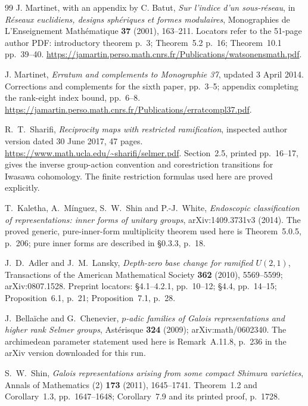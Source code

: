 \documentclass[11pt,a4paper]{article}
\theoremstyle{definition}
\begin{document}
\begin{thebibliography}{99}
J. Martinet, with an appendix by C. Batut,
\emph{Sur l'indice d'un sous-r\'eseau},
in \emph{R\'eseaux euclidiens, designs sph\'eriques et formes modulaires},
Monographies de L'Enseignement Math\'ematique \textbf{37}
(2001), 163--211.
Locators refer to the 51-page author PDF:
introductory theorem p.~3; Theorem~5.2 p.~16;
Theorem~10.1 pp.~39--40.
\url{https://jamartin.perso.math.cnrs.fr/Publications/watsonensmath.pdf}.


J. Martinet,
\emph{Erratum and complements to Monographie 37},
updated 3 April 2014.
Corrections and complements for the sixth paper, pp.~3--5;
appendix completing the rank-eight index bound, pp.~6--8.
\url{https://jamartin.perso.math.cnrs.fr/Publications/erratcompl37.pdf}.

R.~T.~Sharifi,
\emph{Reciprocity maps with restricted ramification},
inspected author version dated 30 June 2017, 47 pages.
\url{https://www.math.ucla.edu/~sharifi/selmer.pdf}.
Section~2.5, printed pp.~16--17, gives the inverse group-action
convention and corestriction transitions for Iwasawa cohomology.
The finite restriction formulas used here are proved explicitly.

T.~Kaletha, A.~M\'inguez, S.~W.~Shin and P.-J.~White,
\emph{Endoscopic classification of representations: inner forms of unitary groups},
arXiv:1409.3731v3 (2014).
The proved generic, pure-inner-form multiplicity theorem used here is
Theorem~5.0.5, p.~206; pure inner forms are described in \S0.3.3, p.~18.


J.~D.~Adler and J.~M.~Lansky,
\emph{Depth-zero base change for ramified $U(2,1)$},
Transactions of the American Mathematical Society \textbf{362} (2010),
5569--5599; arXiv:0807.1528.
Preprint locators: \S4.1--4.2.1, pp.~10--12;
\S4.4, pp.~14--15; Proposition~6.1, p.~21;
Proposition~7.1, p.~28.


J.~Bella\"iche and G.~Chenevier,
\emph{$p$-adic families of Galois representations and higher rank Selmer groups},
Ast\'erisque \textbf{324} (2009); arXiv:math/0602340.
The archimedean parameter statement used here is Remark~A.11.8,
p.~236 in the arXiv version downloaded for this run.


S.~W.~Shin,
\emph{Galois representations arising from some compact Shimura varieties},
Annals of Mathematics (2) \textbf{173} (2011), 1645--1741.
Theorem~1.2 and Corollary~1.3, pp.~1647--1648;
Corollary~7.9 and its printed proof, p.~1728.



\end{thebibliography}
\end{document}
